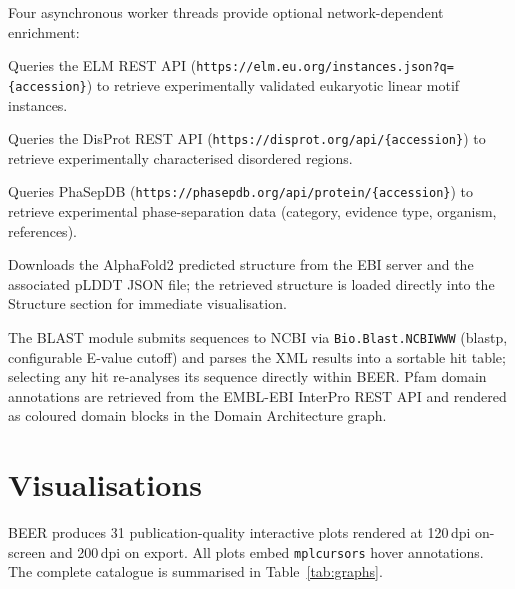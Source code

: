 \documentclass[12pt]{article}
\begin{document}
Four asynchronous worker threads provide optional network-dependent enrichment:

\begin{description}[noitemsep]
  \item[ELMWorker] Queries the ELM REST API
        (\texttt{https://elm.eu.org/instances.json?q=\{accession\}}) to
        retrieve experimentally validated eukaryotic linear motif instances.
  \item[DisPRotWorker] Queries the DisProt REST API
        (\texttt{https://disprot.org/api/\{accession\}}) to retrieve
        experimentally characterised disordered regions.
  \item[PhaSepDBWorker] Queries PhaSepDB
        (\texttt{https://phasepdb.org/api/protein/\{accession\}}) to
        retrieve experimental phase-separation data (category, evidence type,
        organism, references).
  \item[AlphaFoldWorker] Downloads the AlphaFold2 predicted structure from
        the EBI server and the associated pLDDT JSON file; the retrieved
        structure is loaded directly into the Structure section for immediate
        visualisation.
\end{description}

The BLAST module submits sequences to NCBI via \texttt{Bio.Blast.NCBIWWW}
(blastp, configurable E-value cutoff) and parses the XML results into a
sortable hit table; selecting any hit re-analyses its sequence directly within
BEER.
Pfam domain annotations are retrieved from the EMBL-EBI InterPro REST API
and rendered as coloured domain blocks in the Domain Architecture graph.

\section{Visualisations}
\label{sec:viz}

BEER produces 31 publication-quality interactive plots rendered at 120\,dpi
on-screen and 200\,dpi on export.
All plots embed \texttt{mplcursors} hover annotations.
The complete catalogue is summarised in Table~\ref{tab:graphs}.
\end{document}
